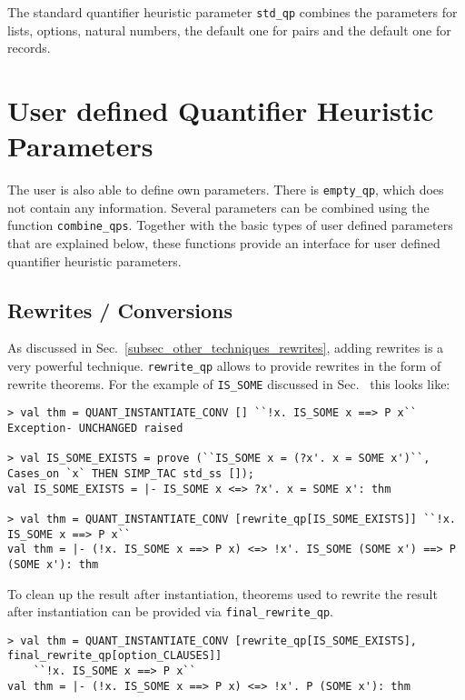 \documentclass[a4paper,12pt,DIV=12,oneside]{scrbook}
\theoremstyle{definition}
\theoremstyle{remark}
\begin{document}
The standard quantifier heuristic parameter \texttt{std\_qp} combines
the parameters for lists, options, natural numbers, the default one
for pairs and the default one for records.


\section{User defined Quantifier Heuristic Parameters}\label{sec_qps_user}

The user is also able to define own parameters. There
is \texttt{empty\_qp}, which does not contain any information. Several
parameters can be combined using the function
\texttt{combine\_qps}. Together with the basic types of user defined
parameters that are explained below, these functions provide an
interface for user defined quantifier heuristic parameters.

\subsection{Rewrites / Conversions}

As discussed in Sec.~\ref{subsec_other_techniques_rewrites}, adding
rewrites is a very powerful technique. \texttt{rewrite\_qp} allows to provide rewrites in the form of rewrite theorems.
For the example of \texttt{IS\_SOME} discussed in Sec.~\label{subsec_other_techniques_rewrites} this
looks like:

{\scriptsize
\begin{verbatim}
> val thm = QUANT_INSTANTIATE_CONV [] ``!x. IS_SOME x ==> P x``
Exception- UNCHANGED raised

> val IS_SOME_EXISTS = prove (``IS_SOME x = (?x'. x = SOME x')``, Cases_on `x` THEN SIMP_TAC std_ss []);
val IS_SOME_EXISTS = |- IS_SOME x <=> ?x'. x = SOME x': thm

> val thm = QUANT_INSTANTIATE_CONV [rewrite_qp[IS_SOME_EXISTS]] ``!x. IS_SOME x ==> P x``
val thm = |- (!x. IS_SOME x ==> P x) <=> !x'. IS_SOME (SOME x') ==> P (SOME x'): thm
\end{verbatim}}

To clean up the result after instantiation, theorems used to rewrite the result after instantiation can be provided via
\texttt{final\_rewrite\_qp}.

{\scriptsize
\begin{verbatim}
> val thm = QUANT_INSTANTIATE_CONV [rewrite_qp[IS_SOME_EXISTS], final_rewrite_qp[option_CLAUSES]]
    ``!x. IS_SOME x ==> P x``
val thm = |- (!x. IS_SOME x ==> P x) <=> !x'. P (SOME x'): thm
\end{verbatim}}
\end{document}

